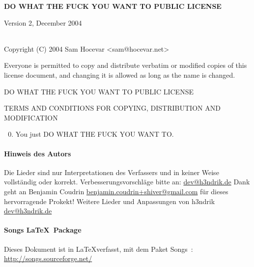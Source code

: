 \begin{center} 
  \textbf{\LARGE{DO WHAT THE FUCK YOU WANT TO PUBLIC LICENSE}}

    Version 2, December 2004

~\\

Copyright (C) 2004 Sam Hocevar <sam@hocevar.net> 
\end{center}
\vspace{1cm}

\begin{lblock}
   Everyone is permitted to copy and distribute verbatim or modified 
 copies of this license document, and changing it is allowed as long 
 as the name is changed. 
\end{lblock}
\begin{lblock}
\centering

DO WHAT THE FUCK YOU WANT TO PUBLIC LICENSE 

TERMS AND CONDITIONS FOR COPYING, DISTRIBUTION AND MODIFICATION

\begin{enumerate}
\setcounter{enumi}{-1}
\item You just DO WHAT THE FUCK YOU WANT TO.
\end{enumerate}
\end{lblock}
\paragraph{Hinweis des Autors}
Die Lieder sind nur Interpretationen des Verfassers und in keiner Weise
vollst\"andig oder korrekt.
Verbesserungsvorschl\"age bitte an: \url{dev@h3ndrik.de}
Dank geht an Benjamin Coudrin \url{benjamin.coudrin+shiver@gmail.com} f\"ur
dieses hervorragende Prokekt! Weitere Lieder und Anpassungen von h3ndrik \url{dev@h3ndrik.de}

\paragraph{Songs \LaTeX~Package}
Dieses Dokument ist in \LaTeX verfasst, mit dem Paket Songs~:
\mbox{\url{http://songs.sourceforge.net/}}

